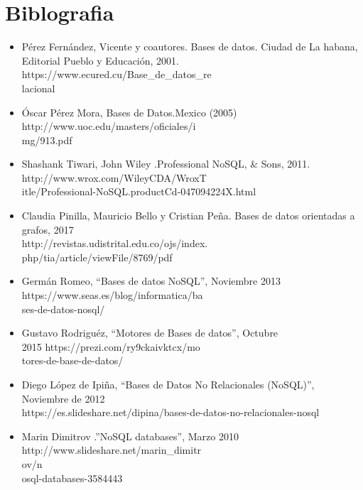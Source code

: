 \documentclass[twoside,twocolumn]{article}
\begin{document}
\section{Biblografia}

\begin{itemize}
    \item Pérez Fernández, Vicente y coautores. Bases de datos. Ciudad de La habana, Editorial Pueblo y Educación, 2001. \\
    https://www.ecured.cu/Base\_de\_datos\_re\\lacional 
    \item Óscar Pérez Mora, Bases de Datos.Mexico (2005) \\http://www.uoc.edu/masters/oficiales/i\\mg/913.pdf 
    \item Shashank Tiwari, John Wiley .Professional NoSQL, \& Sons, 2011. \\
    http://www.wrox.com/WileyCDA/WroxT\\itle/Professional-NoSQL.productCd-047094224X.html 
    \item Claudia Pinilla, Mauricio Bello y Cristian Peña. Bases de datos orientadas a grafos, 2017 \\
    http://revistas.udistrital.edu.co/ojs/index.\\php/tia/article/viewFile/8769/pdf
    \item Germán Romeo, “Bases de datos NoSQL”, Noviembre 2013 \\ https://www.seas.es/blog/informatica/ba\\ses-de-datos-nosql/ 
    \item Gustavo Rodriguéz, “Motores de Bases de datos”, Octubre \\ 2015 https://prezi.com/ry9ckaivktcx/mo\\tores-de-base-de-datos/ 
    \item Diego López de Ipiña, “Bases de Datos No Relacionales (NoSQL)”, Noviembre de 2012\\
     https://es.slideshare.net/dipina/bases-de-datos-no-relacionales-nosql
     \item Marin Dimitrov .”NoSQL databases”, Marzo 2010 \\ http://www.slideshare.net/marin\_dimitr\\ov/n\\osql-databases-3584443
\end{itemize}

\end{document}
